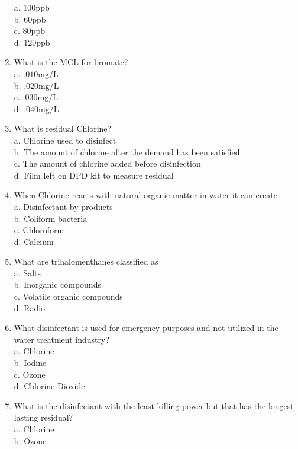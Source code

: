 \begin{enumerate}[1.]
a. $100 \mathrm{ppb}$\\
b. $60 \mathrm{ppb}$\\
c. $80 \mathrm{ppb}$\\
d. $120 \mathrm{ppb}$\\
\item What is the MCL for bromate?\\
a. $.010 \mathrm{mg} / \mathrm{L}$\\
b. $.020 \mathrm{mg} / \mathrm{L}$\\
c. $.030 \mathrm{mg} / \mathrm{L}$\\
d. $.040 \mathrm{mg} / \mathrm{L}$\\
\item What is residual Chlorine?\\
a. Chlorine used to disinfect\\
b. The amount of chlorine after the demand has been satisfied\\
c. The amount of chlorine added before disinfection\\
d. Film left on DPD kit to measure residual\\
\item When Chlorine reacts with natural organic matter in water it can create\\
a. Disinfectant by-products\\
b. Coliform bacteria\\
c. Chloroform\\
d. Calcium\\
\item What are trihalomenthanes classified as\\
a. Salts\\
b. Inorganic compounds\\
c. Volatile organic compounds\\
d. Radio\\
\item What disinfectant is used for emergency purposes and not utilized in the water treatment industry?\\
a. Chlorine\\
b. Iodine\\
c. Ozone\\
d. Chlorine Dioxide\\
\item What is the disinfectant with the least killing power but that has the longest lasting residual?\\
a. Chlorine\\
b. Ozone\\

\end{enumerate}
